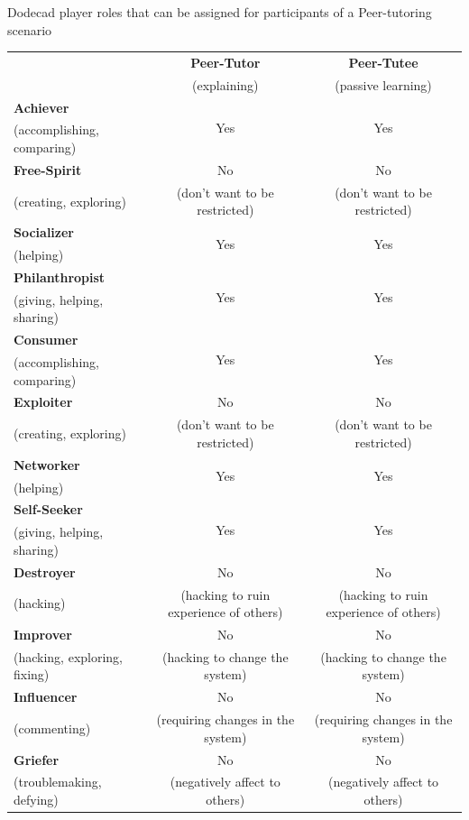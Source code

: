 \begin{quadro}[htb]
\caption{Dodecad player roles that can be assigned for participants of a Peer-tutoring scenario}
\label{tab:player-roles-in-peer-tutoring-cl-scenarios}
\centering
\scriptsize
\begin{tabular}{|l|c|c|}

\hline%
\multicolumn{1}{|l}{}&
\multicolumn{1}{|c}{\textbf{Peer-Tutor}}&
\multicolumn{1}{|c|}{\textbf{Peer-Tutee}}\tabularnewline
\multicolumn{1}{|l}{}&
\multicolumn{1}{|c}{\footnotesize(explaining)}&
\multicolumn{1}{|c|}{\footnotesize(passive learning)}\tabularnewline
\hline
\hline

\textbf{Achiever}&\multirow{2}{*}{Yes}&\multirow{2}{*}{Yes}\tabularnewline
{\footnotesize(accomplishing, comparing)}& & \tabularnewline
\hline

\textbf{Free-Spirit}&No&No\tabularnewline
{\footnotesize(creating, exploring)}&{\footnotesize(don't want to be restricted)}&{\footnotesize(don't want to be restricted)}\tabularnewline
\hline

\textbf{Socializer}&\multirow{2}{*}{Yes}&\multirow{2}{*}{Yes}\tabularnewline
{\footnotesize(helping)}& & \tabularnewline
\hline

\textbf{Philanthropist}&\multirow{2}{*}{Yes}&\multirow{2}{*}{Yes}\tabularnewline
{\footnotesize(giving, helping, sharing)}& & \tabularnewline
\hline

\textbf{Consumer}&\multirow{2}{*}{Yes}&\multirow{2}{*}{Yes}\tabularnewline
{\footnotesize(accomplishing, comparing)}& & \tabularnewline
\hline

\textbf{Exploiter}&No&No\tabularnewline
{\footnotesize(creating, exploring)}&{\footnotesize(don't want to be restricted)}&{\footnotesize(don't want to be restricted)} \tabularnewline
\hline

\textbf{Networker}&\multirow{2}{*}{Yes}&\multirow{2}{*}{Yes}\tabularnewline
{\footnotesize(helping)}& & \tabularnewline
\hline

\textbf{Self-Seeker}&\multirow{2}{*}{Yes}&\multirow{2}{*}{Yes}\tabularnewline
{\footnotesize(giving, helping, sharing)}& & \tabularnewline
\hline

\textbf{Destroyer}&No&No \tabularnewline
{\footnotesize(hacking)}&{\footnotesize(hacking to ruin experience of others)}&{\footnotesize(hacking to ruin experience of others)}\tabularnewline
\hline

\textbf{Improver}&No&No\tabularnewline
{\footnotesize(hacking, exploring, fixing)}&{\footnotesize(hacking to change the system)}&{\footnotesize(hacking to change the system)}\tabularnewline
\hline

\textbf{Influencer}&No&No \tabularnewline
{\footnotesize(commenting)}&{\footnotesize(requiring changes in the system)}&{\footnotesize(requiring changes in the system)} \tabularnewline
\hline

\textbf{Griefer}&No&No\tabularnewline
{\footnotesize(troublemaking, defying)}&{\footnotesize(negatively affect to others)}&{\footnotesize(negatively affect to others)}\tabularnewline

\hline
\end{tabular}
 \fautor
\end{quadro}


